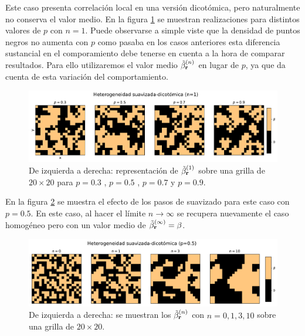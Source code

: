 Este caso presenta correlación local en una versión dicotómica, pero naturalmente no conserva el valor medio. En la figura \ref{fig:smoth_dic} se muestran 
realizaciones para distintos valores de $p$ con $n=1$. Puede observarse a simple viste que la densidad de puntos negros no aumenta con $p$ como 
pasaba en los casos anteriores esta diferencia sustancial en el comporamiento debe tenerse en cuenta a la hora de comparar resultados. Para ello 
utilizaremos el valor medio $\tilde{\beta}^{(n)}_{\vb r}$ en lugar de $p$, ya que da cuenta de esta variación del comportamiento.

\begin{figure}[h]
  \centering
  \includegraphics[width=1\textwidth]{het_suav_dico.pdf}
  \caption{De izquierda a derecha: representación de $\tilde{\beta}^{(1)}_{\vb r}$ sobre una grilla de $20 \times 20$ para  $p=0.3$ , $p=0.5$ , $p=0.7$ y $p=0.9$.}
  \label{fig:smoth_dic}  
\end{figure}

En la figura \ref{fig:smoth_dic_step} se muestra el efecto de los pasos de suavizado para este caso con $p=0.5$. En este caso, al hacer el límite 
$n\to \infty$ se recupera nuevamente el caso homogéneo pero con un valor medio de $\tilde{\beta}^{(\infty)}_{\vb r}=\beta$.

\begin{figure}[h]
  \centering
  \includegraphics[width=1\textwidth]{nsmoth_dic_step.pdf}
  \caption{De izquierda a derecha: se muestran los $\tilde{\beta}^{(n)}_{\vb r}$ con $n=0,1,3,10$ sobre una grilla de $20\times20$.}
  \label{fig:smoth_dic_step}
\end{figure}